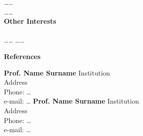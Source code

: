 \documentclass[10pt]{amsart}
\begin{document}
	
	
	\ldots\ldots\\
	\ldots\ldots\\
	
	
	
	{\large {\bf Other Interests}} \\[-.08cm]%
	\underline{\hspace{6in}} \\[.2cm] 
	\ldots\ldots
	\newline\ldots\ldots
	\newline \newline
	
	
	{\large {\bf References}} \\[-.08cm]%
	\underline{\hspace{6in}} 
	\begin{multicols}{2}
		
		{\bf Prof. Name Surname}\newline
		Institution\\
		Address\\
		Phone: \ldots\\
		e-mail:  \ldots  
		\newline\newline
		{\bf Prof. Name Surname}\newline
		Institution\\
		Address\\
		Phone: \ldots\\
		e-mail:  \ldots 
	\end{multicols}
	
	
	
\end{document}
